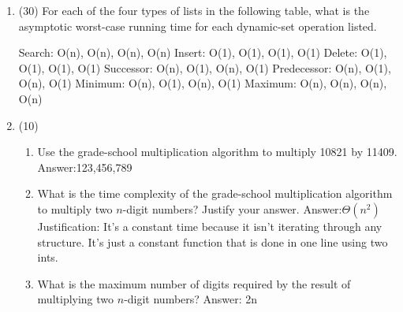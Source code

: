 \documentclass[12pt]{article}
\newenvironment{problem}[2][Problem]{\begin{trivlist}
\item[\hskip \labelsep {\bfseries #1}\hskip \labelsep {\bfseries #2.}]}{\end{trivlist}}
\begin{document}
\begin{enumerate}
\item (30) For each of the four types of lists in the following table, what is the asymptotic 
worst-case running time for each dynamic-set operation listed.
\begin{center}
Search: O(n), O(n), O(n), O(n) \newline
Insert: O(1), O(1), O(1), O(1)\newline
Delete: O(1), O(1), O(1), O(1) \newline
Successor: O(n), O(1), O(n), O(1) \newline
Predecessor: O(n), O(1), O(n), O(1) \newline
Minimum: O(n), O(1), O(n), O(1) \newline
Maximum: O(n), O(n), O(n), O(n) \newline
\end{center}

\item (10)
\begin{enumerate}
\item Use the grade-school multiplication algorithm to multiply 10821 by 11409.\newline
Answer:123,456,789
\item What is the time complexity of the grade-school multiplication algorithm to multiply two $
n$-digit numbers? Justify your answer.
\newline
Answer:$\Theta(n^2)$
\newline
Justification: It's a constant time because it isn't iterating through any structure. It's just a constant function that is done in one line using two ints.
\item What is the maximum number of digits required by the result of multiplying two $n$-digit 
numbers?\newline
Answer: 2n
\end{enumerate}



\end{enumerate}
\end{document}
